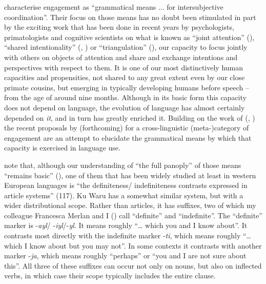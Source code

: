\documentclass[output=paper]{langsci/langscibook}
\begin{document}
\citet[112]{Evansetal2018} characterise engagement as “grammatical means ... for intersubjective coordination”. Their focus on those means has no doubt been stimulated in part by the exciting work that has been done in recent years by psychologists, primatologists and cognitive scientists on what is known as “joint attention” (\citealt{Elian2005}), “shared intentionality” (\citealt{Tomasello1999}, \citealt{Tomasello2005}) or “triangulation” (\citealt{Hobson2004}), our capacity to focus jointly with others on objects of attention and share and exchange intentions and perspectives with respect to them. It is one of our most distinctively human capacities and propensities, not shared to any great extent even by our close primate cousins, but emerging in typically developing humans before speech – from the age of around nine months. Although in its basic form this capacity does not depend on language, the evolution of language has almost certainly depended on \textit{it}, and in turn has greatly enriched it. Building on the work of \citeauthor{Landaburu2005} (\citeyear{Landaburu2005}, \citeyear{Landaburu2007}) the recent proposals by \citet{Evansetal2018} (forthcoming) for a cross-linguistic (meta-)category of engagement are an attempt to elucidate the grammatical means by which that capacity is exercised in language use. 

\citeauthor{Evansetal2018} note that, although our understanding of “the full panoply” of those means “remains basic” (\citeyear[112]{Evansetal2018}), one of them that has been widely studied at least in western European languages is “the definiteness/ indefiniteness contrasts expressed in article systems” (117). %
Ku Waru has a somewhat similar system, but with a wider distributional scope. Rather than articles, it has suffixes, two of which my colleague Francesca Merlan and I (\citealt[336-337]{MerlanRumsey1991}) call “definite” and “indefinite”.  The “definite” marker is   -\textit{ayl}/ -\textit{iyl}/-\textit{yl}. It means roughly “… which you and I know about”. It contrasts most directly with the indefinite marker -\textit{ti}, which means roughly “… which I know about but you may not”. In some contexts it contrasts with another marker -\textit{ja}, which means roughly “perhaps” or “you and I are not sure about this”. All three of these suffixes can occur not only on nouns, but also on inflected verbs, in which case their scope typically includes the entire clause.
\end{document}
